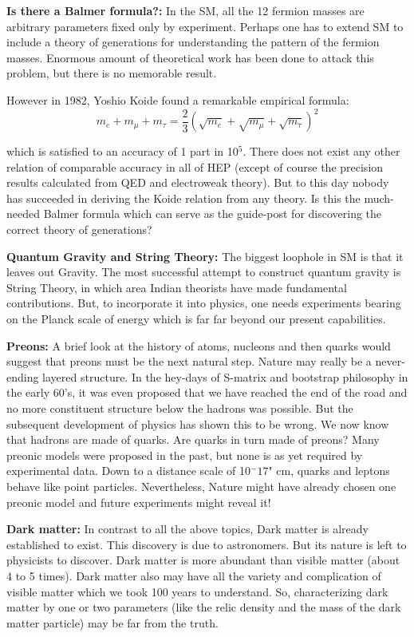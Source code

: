 \textbf{Is there a Balmer formula?:} In the SM, all the 12 fermion masses are
arbitrary parameters fixed only by experiment. Perhaps one has to extend
SM to include a theory of generations for understanding the pattern of the
fermion masses. Enormous amount of theoretical work has been done to
attack this problem, but there is no memorable result. 

However in 1982, Yoshio Koide found a remarkable empirical formula: 
$$
m_{e} + m_{\mu} + m_{\tau} = \frac{2}{3}(\sqrt{m_{e}} + \sqrt{m_{\mu}} + \sqrt{m_{\tau}})^{2}
$$

which is satisfied to an accuracy of 1 part in 10$^{5}$. There does not exist any
other relation of comparable accuracy in all of HEP (except of course the
precision results calculated from QED and electroweak theory). But to this
day nobody has succeeded in deriving the Koide relation from any theory. Is
this the much-needed Balmer formula which can serve as the guide-post for
discovering the correct theory of generations? 



\textbf{Quantum Gravity and String Theory:} The biggest loophole in SM is
that it leaves out Gravity. The most successful attempt to construct quantum
gravity is String Theory, in which area Indian theorists have made fundamental contributions. But, to incorporate it into physics, one needs experiments
bearing on the Planck scale of energy which is far far beyond our present
capabilities. 



\textbf{Preons:} A brief look at the history of atoms, nucleons and then quarks
would suggest that preons must be the next natural step. Nature may really
be a never-ending layered structure. In the hey-days of S-matrix and bootstrap philosophy in the early 60’s, it was even proposed that we have reached the end of the road and no more constituent structure below the hadrons was
possible. But the subsequent development of physics has shown this to be
wrong. We now know that hadrons are made of quarks. Are quarks in turn
made of preons? Many preonic models were proposed in the past, but none is
as yet required by experimental data. Down to a distance scale of 10$^-17$" cm,
quarks and leptons behave like point particles. Nevertheless, Nature might
have already chosen one preonic model and future experiments might reveal
it! 

\vspace{.2cm}

\textbf{Dark matter:} In contrast to all the above topics, Dark matter is already
established to exist. This discovery is due to astronomers. But its nature
is left to physicists to discover. Dark matter is more abundant than visible
matter (about 4 to 5 times). Dark matter also may have all the variety and
complication of visible matter which we took 100 years to understand. So,
characterizing dark matter by one or two parameters (like the relic density
and the mass of the dark matter particle) may be far from the truth. 


